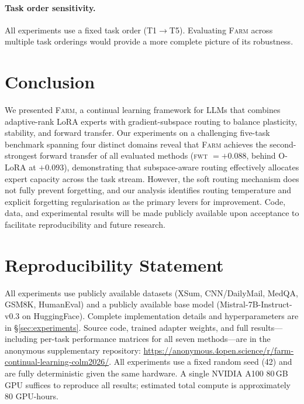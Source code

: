 \documentclass{article}
\newcommand{\FARM}{\textsc{Farm}}
\newcommand{\FWT}{\textsc{fwt}}
\begin{document}
\paragraph{Task order sensitivity.}
All experiments use a fixed task order (T1$\to$T5). Evaluating \FARM{} across multiple task orderings would provide a more complete picture of its robustness.

\section{Conclusion}
\label{sec:conclusion}

We presented \FARM{}, a continual learning framework for LLMs that combines adaptive-rank LoRA experts with gradient-subspace routing to balance plasticity, stability, and forward transfer. Our experiments on a challenging five-task benchmark spanning four distinct domains reveal that \FARM{} achieves the second-strongest forward transfer of all evaluated methods (\FWT{} $= +0.088$, behind O-LoRA at $+0.093$), demonstrating that subspace-aware routing effectively allocates expert capacity across the task stream. However, the soft routing mechanism does not fully prevent forgetting, and our analysis identifies routing temperature and explicit forgetting regularisation as the primary levers for improvement. Code, data, and experimental results will be made publicly available upon acceptance to facilitate reproducibility and future research.

\clearpage
\section*{Reproducibility Statement}
All experiments use publicly available datasets (XSum, CNN/DailyMail, MedQA, GSM8K, HumanEval) and a publicly available base model (Mistral-7B-Instruct-v0.3 on HuggingFace). Complete implementation details and hyperparameters are in \S\ref{sec:experiments}. Source code, trained adapter weights, and full results---including per-task performance matrices for all seven methods---are in the anonymous supplementary repository: \url{https://anonymous.4open.science/r/farm-continual-learning-colm2026/}. All experiments use a fixed random seed (42) and are fully deterministic given the same hardware. A single NVIDIA A100 80\,GB GPU suffices to reproduce all results; estimated total compute is approximately 80 GPU-hours.




\end{document}
